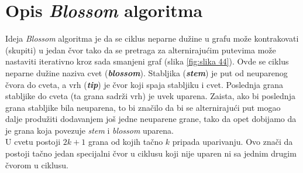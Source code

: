 \documentclass[11pt,a4paper]{article}
\theoremstyle{definition}
\begin{document}
\newpage
\section{Opis \textit{Blossom} algoritma}
Ideja \textit{Blossom} algoritma je da se ciklus neparne dužine u grafu može kontrakovati (skupiti) u jedan čvor tako da se pretraga za alternirajućim putevima može nastaviti iterativno kroz sada smanjeni graf \cite{sajt2} (slika \ref{fig:slika 44}). Ovde se ciklus neparne dužine naziva cvet (\textbf{\textit{blossom}}). Stabljika (\textbf{\textit{stem}}) je put od neuparenog čvora do cveta, a vrh (\textbf{\textit{tip}}) je čvor koji spaja stabljiku i cvet. Poslednja grana stabljike do cveta (ta grana sadrži vrh) je uvek uparena. Zaista, ako bi poslednja grana stabljike bila neuparena, to bi značilo da bi se alternirajući put mogao dalje produžiti dodavanjem još jedne neuparene grane, tako da opet dobijamo da je grana koja povezuje \textit{stem} i \textit{blossom} uparena.\\ U cvetu postoji $2k+1$ grana od kojih tačno $k$ pripada uparivanju.\cite{sajt1} Ovo znači da postoji tačno jedan specijalni čvor u ciklusu koji nije uparen ni sa jednim drugim čvorom u ciklusu.
\end{document}
